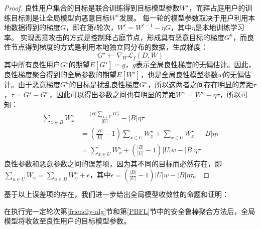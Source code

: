 \begin{proof}
	良性用户集合的目标是联合训练得到目标模型参数$W^{\star}$，而拜占庭用户的训练目标则是让全局模型向恶意目标$W^{\kappa}$发展。
	每一轮的模型参数取决于用户利用本地数据得到的梯度$G$，即在第$t$轮次，$W^{t} = W^{t-1} - \eta G$，其中$ \eta $是本地训练学习率。
	实现恶意攻击的方式是控制拜占庭节点，形成具有恶意目标的梯度$G^{\kappa}$，而良性节点得到梯度的方式是利用本地独立同分布的数据，生成梯度：
	$$
		G^{\star} \leftarrow \nabla_{W} \mathcal{L}_{f}(D,W)
	$$
	其中所有良性用户$G^{\star}$的期望$E[G^{\star}]=g$，$g$表示全局良性梯度的无偏估计。因此，良性梯度聚合得到的全局参数的期望$E[W^{\star}]$，也是全局良性模型参数$w$的无偏估计。由于恶意梯度$G^{\kappa}$的目标是扰乱良性梯度$G^{\star}$，所以这两者之间存在明显的差距$\tau$，$\tau = G^{\star}-G^{\kappa}$，因此可以得出参数之间也有明显的差距$W^{\kappa} = W^{\star} - \eta \tau$，所以可知：
	\begin{align*}
		\sum_{x\in B}W_x^{\kappa} & = \frac{|B|\sum_{x\in U}W_x^{\star}}{|U|} - |B|\eta\tau                                \\
		& = (\frac{|B|}{|U|}-1)\sum_{x\in U}W_x^{\star} + \sum_{x\in U}W_x^{\star} - |B|\eta\tau \\
		& = \sum_{x\in U}W_x^{\star} + (\frac{|B|}{|U|}-1)|U|w - |B|\eta\tau
	\end{align*}
	良性参数和恶意参数之间的误差项，因为其不同的目标而必然存在，即$\sum_{u\in U}W_u=   \sum_{u\in B}W_u^{\kappa} + \epsilon$，其中$ \epsilon = (\frac{|B|}{|U|}-1)|U|w - |B|\eta\tau $。
\end{proof}

基于以上误差项的存在，我们进一步给出全局模型收敛性的命题和证明：
\begin{proposition}[收敛性]
	在执行完一定轮次第\ref{friendly-alg}节和第\ref{PBFL}节中的安全鲁棒聚合方法后，全局模型将收敛至良性用户的目标模型参数。
\end{proposition}

